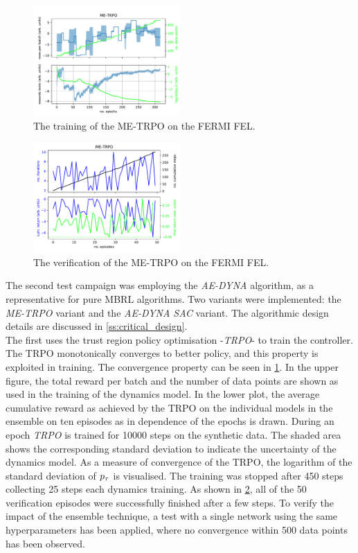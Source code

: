 \documentclass[
reprint,
amsmath,amssymb,amsfonts,clevref,
aps,
prstab,
]{revtex4-2}
\begin{document}
	
	\begin{figure}[!h]
		\centering
		\includegraphics*[width=0.5\textwidth]{Figures/ME-TRPO_observables.pdf}
		\caption{The training of the ME-TRPO on the FERMI FEL.}
		\label{fig:ME-TRPO_observables}
	\end{figure}
	\begin{figure}[!h]
		\centering
		\includegraphics*[width=0.5\textwidth]{Figures/ME-TRPO_verification.pdf}
		\caption{The verification of the ME-TRPO on the FERMI FEL.}
		\label{fig:ME-TRPO_verification}
	\end{figure}
	The second test campaign was employing the \emph{AE-DYNA} algorithm, as a representative for pure MBRL algorithms. Two variants were implemented: the \emph{ME-TRPO} variant and the \emph{AE-DYNA SAC} variant. The algorithmic design details are discussed in \cref{ss:critical_design}. 
	\\ The first uses the trust region policy optimisation -\emph{TRPO}- \cite{Schulman2015} to train the controller. The TRPO monotonically converges to better policy, and this property is exploited in training. The convergence property can be seen in \cref{fig:ME-TRPO_observables}. In the upper figure, the total reward per batch and the number of data points are shown as used in the training of the dynamics model. In the lower plot, the average cumulative reward as achieved by the TRPO on the individual models in the ensemble on ten episodes as in dependence of the epochs is drawn. During an epoch \emph{TRPO} is trained for 10000 steps on the synthetic data. The shaded area shows the corresponding standard deviation to indicate the uncertainty of the dynamics model. As a measure of convergence of the TRPO, the logarithm of the standard deviation of $p_\tau$ is visualised. The training was stopped after 450 steps collecting 25 steps each dynamics training. As shown in \cref{fig:ME-TRPO_verification}, all of the 50 verification episodes were successfully finished after a few steps. To verify the impact of the ensemble technique, a test with a single network using the same hyperparameters has been applied, where no convergence within 500 data points has been observed. \\
\end{document}
